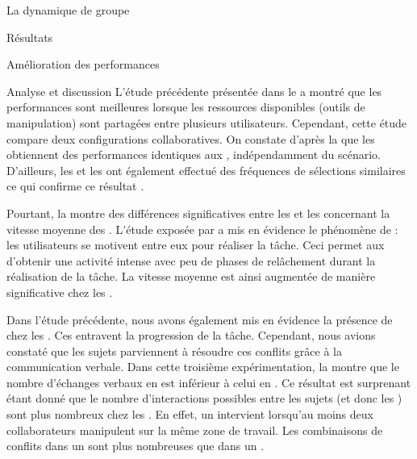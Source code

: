 \documentclass[myfrancais,ngerman,english,frenchb]{mythesis}
\begin{document}
\begin{mychapter}{La dynamique de groupe}
\begin{mysection}{Résultats}
\begin{mysubsection}{Amélioration des performances}
\begin{mysubsubsection}{Analyse et discussion}
					L'étude précédente présentée dans le  a montré que les performances sont meilleures lorsque les ressources disponibles (outils de manipulation) sont partagées entre plusieurs utilisateurs.
					Cependant, cette étude compare deux configurations collaboratives.
					On constate d'après la  que les  obtiennent des performances identiques aux , indépendamment du scénario.
					D'ailleurs, les  et les  ont également effectué des fréquences de sélections similaires ce qui confirme ce résultat .

					Pourtant, la  montre des différences significatives entre les  et les  concernant la vitesse moyenne des .
					L'étude exposée par  a mis en évidence le phénomène de  : les utilisateurs se motivent entre eux pour réaliser la tâche.
					Ceci permet aux  d'obtenir une activité intense avec peu de phases de relâchement durant la réalisation de la tâche.
					La vitesse moyenne est ainsi augmentée de manière significative chez les .

					Dans l'étude précédente, nous avons également mis en évidence la présence de  chez les .
					Ces  entravent la progression de la tâche.
					Cependant, nous avions constaté que les sujets parviennent à résoudre ces conflits grâce à la communication verbale.
					Dans cette troisième expérimentation, la  montre que le nombre d'échanges verbaux en  est inférieur à celui en .
					Ce résultat est surprenant étant donné que le nombre d'interactions possibles entre les sujets (et donc les ) sont plus nombreux chez les .
					En effet, un  intervient lorsqu'au moins deux collaborateurs manipulent sur la même zone de travail.
					Les combinaisons de conflits dans un  sont plus nombreuses que dans un .


\end{mysubsubsection}
\end{mysubsection}
\end{mysection}
\end{mychapter}
\end{document}
